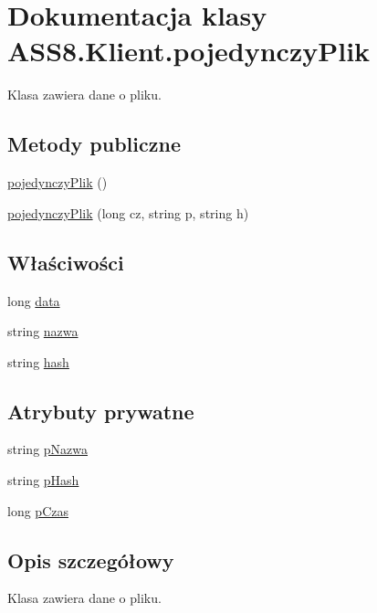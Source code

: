 \hypertarget{a00020}{
\section{Dokumentacja klasy ASS8.Klient.pojedynczyPlik}
\label{db/db2/a00020}
}
Klasa zawiera dane o pliku.  


\subsection*{Metody publiczne}
\begin{CompactItemize}
\item 
\hyperlink{a00020_1b44b61561b4931cdb3229a9709675e3}{pojedynczyPlik} ()
\item 
\hyperlink{a00020_d818288fef4645e6b690b3d055e20ecb}{pojedynczyPlik} (long cz, string p, string h)
\end{CompactItemize}
\subsection*{Właściwości}
\begin{CompactItemize}
\item 
long \hyperlink{a00020_120fea65780ab33942c7d28c6443cfdf}{data}
\item 
string \hyperlink{a00020_f792807be9c86aacf7306b9365c2436e}{nazwa}
\item 
string \hyperlink{a00020_e211a903ec9f14ec1e4cc1652ce6ce54}{hash}
\end{CompactItemize}
\subsection*{Atrybuty prywatne}
\begin{CompactItemize}
\item 
string \hyperlink{a00020_4f4c391d3e233b965d3eb42ee93d52a5}{pNazwa}
\item 
string \hyperlink{a00020_13cf9026e491442d7261370a14956892}{pHash}
\item 
long \hyperlink{a00020_bf6c0b5909ca7cd5b160047a425197dc}{pCzas}
\end{CompactItemize}


\subsection{Opis szczegółowy}
Klasa zawiera dane o pliku. 



